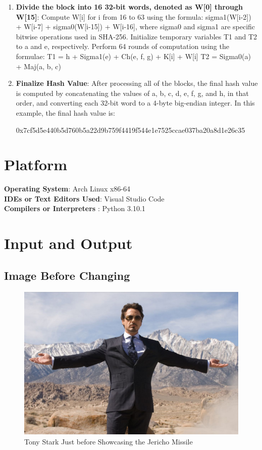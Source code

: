 \documentclass[11pt]{article}
\begin{document}
\begin{enumerate}
    \item \textbf{Divide the block into 16 32-bit words, denoted as W[0] through W[15]}:
          Compute W[i] for i from 16 to 63 using the formula: sigma1(W[i-2]) + W[i-7] + sigma0(W[i-15]) + W[i-16], where sigma0 and sigma1 are specific bitwise operations used in SHA-256.
          Initialize temporary variables T1 and T2 to a and e, respectively.
          Perform 64 rounds of computation using the formulae:
          T1 = h + Sigma1(e) + Ch(e, f, g) + K[i] + W[i]
          T2 = Sigma0(a) + Maj(a, b, c)

    \item \textbf{Finalize Hash Value}: After processing all of the blocks, the final hash value is computed by concatenating the values of a, b, c, d, e, f, g, and h, in that order, and converting each 32-bit word to a 4-byte big-endian integer. In this example, the final hash value is:

          0x7cf5d5e440b5d760b5a22d9b759f4419f544e1e7525ccae037ba20a8d1e26c35
\end{enumerate}


\section{Platform}
\textbf{\textbf{Operating System}}: Arch Linux x86-64 \\
\textbf{\textbf{IDEs or Text Editors Used}}: Visual Studio Code\\
\textbf{\textbf{Compilers or Interpreters} }: Python 3.10.1\\

\section{Input and Output}

\subsection*{Image Before Changing}
\begin{figure}[H]
    \centering
    \includegraphics[width=.90\textwidth]{tony.jpg}
    \caption{Tony Stark Just before Showcasing the Jericho Missile}
\end{figure}
\end{document}
